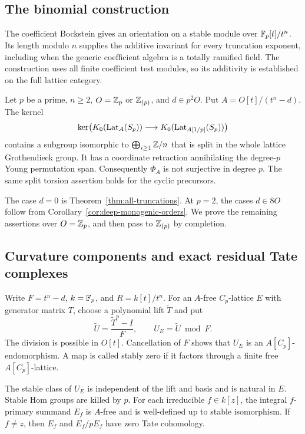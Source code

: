 \subsection{The binomial construction}
\label{sec:binomial-depth-two-all}

The coefficient Bockstein gives an orientation on a stable module over
$\mathbb F_p[t]/t^n$.  Its length modulo $n$ supplies the additive invariant
for every truncation exponent, including when the generic coefficient
algebra is a totally ramified field.  The construction uses all finite
coefficient test modules, so its additivity is established on the full
lattice category.

\begin{theorem}\label{thm:binomial-depth-two-all-exponents}
Let $p$ be a prime, $n\ge2$, $O=\mathbb Z_p$ or $\mathbb Z_{(p)}$, and
$d\in p^2O$.  Put $A=O[t]/(t^n-d)$.  The kernel
\[
 \ker\!\left(K_0(\operatorname{Lat}_A(S_p))
       \longrightarrow K_0(\operatorname{Lat}_{A[1/p]}(S_p))\right)
\]
contains a subgroup isomorphic to
$\bigoplus_{i\ge1}\mathbb Z/n$ that is split in the whole lattice
Grothendieck group.  It has a coordinate retraction annihilating
the degree-$p$ Young permutation span.  Consequently $\Phi_A$
is not surjective in degree $p$.
The same split torsion assertion holds for the cyclic precursors.
\end{theorem}

The case $d=0$ is Theorem~\ref{thm:all-truncations}.
At $p=2$, the cases $d\in8O$ follow from
Corollary~\ref{cor:deep-monogenic-orders}.
We prove the remaining assertions over $O=\mathbb Z_p$, and then pass
to $\mathbb Z_{(p)}$ by completion.

\subsection{Curvature components and exact residual Tate complexes}

Write $F=t^n-d$, $k=\mathbb F_p$, and $R=k[t]/t^n$.
For an $A$-free $C_p$-lattice $E$ with generator matrix $T$,
choose a polynomial lift $\widetilde T$ and put
\[
 \widetilde U=\frac{\widetilde T^p-I}{F},
 \qquad U_E=\widetilde U\bmod F.
\]
The division is possible in $O[t]$.  Cancellation of $F$ shows
that $U_E$ is an $A[C_p]$-endomorphism.
A map is called stably zero if it factors through a finite free
$A[C_p]$-lattice.

\begin{lemma}\label{lem:binomial-all-primary}
The stable class of $U_E$ is independent of the lift and basis
and is natural in $E$.  Stable Hom groups are killed by $p$.
For each irreducible $f\in k[z]$, the integral $f$-primary
summand $E_f$ is $A$-free and is well-defined up to stable
isomorphism.  If $f\ne z$, then $E_f$ and $E_f/pE_f$ have zero
Tate cohomology.
\end{lemma}

